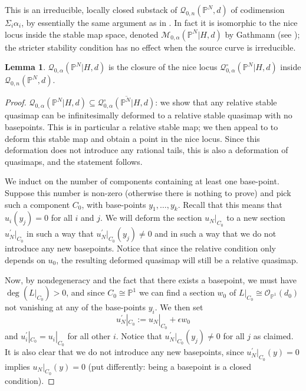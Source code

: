 \documentclass[11pt]{amsart}
\newcommand{\Q}[4]{\mathcal{Q}_{#1,#2}(#3,#4)}
\newcommand{\PP}{\mathbb P}
\newcommand{\OO}{\mathcal{O}}
\theoremstyle{definition}
\newtheorem{lem}[thm]{Lemma}
\theoremstyle{definition}
\begin{document}
This is an irreducible, locally closed substack of $\Q{0}{n}{\PP^N}{d}$ of codimension $\Sigma_i \alpha_i$, by essentially the same argument as in \cite[Lemma 1.8]{Ga}. In fact it is isomorphic to the nice locus inside the stable map space, denoted $\mathcal M_{0,\alpha}(\PP^N|H,d)$ by Gathmann (see \cite[Def. 1.6]{Ga}); the stricter stability condition has no effect when the source curve is irreducible.

\begin{lem} \label{lem:closure}
$\Q{0}{\alpha}{\PP^N|H}{d}$ is the closure of the nice locus $\mathcal{Q}^{\circ}_{0,\alpha}(\PP^N|H,d)$ inside $\Q{0}{n}{\PP^N}{d}$. 
\end{lem}
\begin{proof}
$\Q{0}{\alpha}{\PP^N|H}{d}\subseteq\overline{\mathcal{Q}^{\circ}_{0,\alpha}(\PP^N|H,d)}$: we show that any relative stable quasimap can be infinitesimally deformed to a relative stable quasimap with no basepoints. This is in particular a relative stable map; we then appeal to \cite[Prop. 1.14]{Ga} to deform this stable map and obtain a point in the nice locus. Since this deformation does not introduce any rational tails, this is also a deformation of quasimaps, and the statement follows.

We induct on the number of components containing at least one base-point. Suppose this number is non-zero (otherwise there is nothing to prove) and pick such a component $C_0$, with base-points $y_1 ,\ldots, y_k$. Recall that this means that $u_i(y_j)=0$ for all $i$ and $j$. We will deform the section $u_N|_{C_0}$ to a new section $u_N^\prime|_{C_0}$ in such a way that $u_N^\prime|_{C_0}(y_j) \neq 0$ and in such a way that we do not introduce any new basepoints. Notice that since the relative condition only depends on $u_0$, the resulting deformed quasimap will still be a relative quasimap.

Now, by nondegeneracy and the fact that there exists a basepoint, we must have $\deg(L|_{C_0})>0$, and since $C_0 \cong \PP^1$ we can find a section $w_0$ of $L|_{C_0} \cong \OO_{\PP^1}(d_0)$ not vanishing at any of the base-points $y_i$.
We then set
\begin{equation*} u_N^\prime|_{C_0} := u_N|_{C_0} + \epsilon w_0 \end{equation*}
and $u_i^\prime|_{C_0} = u_i|_{C_0}$ for all other $i$. Notice that $u_N^\prime|_{C_0}(y_j) \neq 0$ for all $j$ as claimed. It is also clear that we do not introduce any new basepoints, since $u_N^\prime|_{C_0}(y) = 0$ implies $u_N|_{C_0}(y)=0$ (put differently: being a basepoint is a closed condition).


\end{proof}
\end{document}

